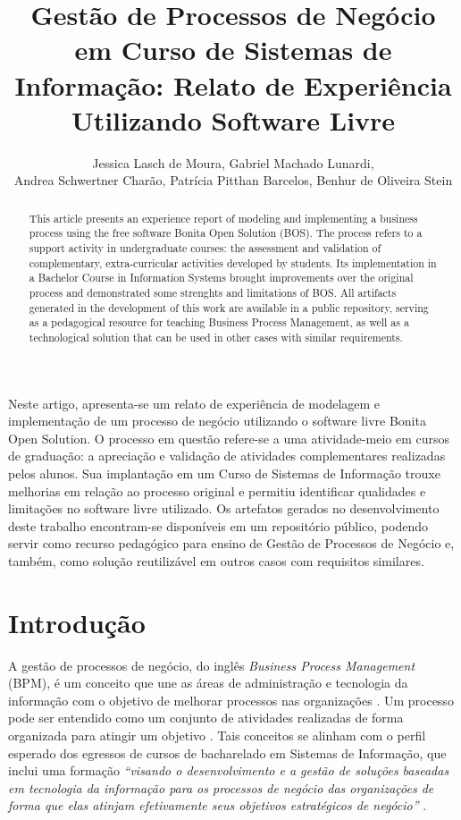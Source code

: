 \documentclass[12pt]{article}
\title{Gestão de Processos de Negócio em Curso de Sistemas de Informação: Relato de Experiência Utilizando Software Livre}
\author{Jessica Lasch de Moura\inst{1}, Gabriel Machado Lunardi\inst{1},\\
Andrea Schwertner Charão\inst{1}, Patrícia Pitthan Barcelos\inst{1}, Benhur de Oliveira Stein\inst{1}}
\begin{document}
\maketitle


\begin{resumo}
Neste artigo, apresenta-se um relato de experiência de modelagem e implementação de um processo de negócio utilizando o software livre Bonita Open Solution. O processo em questão refere-se a uma atividade-meio em cursos de graduação: a apreciação e validação de atividades complementares realizadas pelos alunos. Sua implantação em um Curso de Sistemas de Informação trouxe melhorias em relação ao processo original e permitiu identificar qualidades e limitações no software livre utilizado. Os artefatos gerados no desenvolvimento deste trabalho encontram-se disponíveis em um repositório público, podendo servir como recurso pedagógico para ensino de Gestão de Processos de Negócio e, também, como solução reutilizável em outros casos com requisitos similares.
\end{resumo}


\begin{abstract}
This article presents an experience report of modeling and implementing a business process using the free software Bonita Open Solution (BOS). The process refers to a support activity in undergraduate courses: the assessment and validation of complementary, extra-curricular activities developed by students. Its implementation in a Bachelor Course in Information Systems brought improvements over the original process and demonstrated some strenghts and limitations of BOS. All artifacts generated in the development of this work are available in a public repository, serving as a pedagogical resource for teaching Business Process Management, as well as a technological solution that can be used in other cases with similar requirements.
\end{abstract}


\section{Introdução}

A gestão de processos de negócio, do inglês \emph{Business Process Management} (BPM), é um conceito que une as áreas de administração e tecnologia da informação com o objetivo de melhorar processos nas organizações \cite{weske}. Um processo pode ser entendido como um conjunto de atividades realizadas de forma organizada para atingir um objetivo \cite{ABPMP}. Tais conceitos se alinham com o perfil esperado dos egressos de cursos de bacharelado em Sistemas de Informação, que inclui uma formação \emph{“visando o desenvolvimento e a gestão de soluções baseadas em tecnologia da informação para os processos de negócio das organizações de forma que elas atinjam efetivamente seus objetivos estratégicos de negócio”} \cite{parecer:136}.
\end{document}
